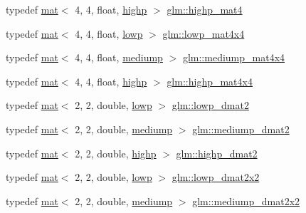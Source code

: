 \begin{DoxyCompactItemize}
\item 
typedef \hyperlink{structglm_1_1mat}{mat}$<$ 4, 4, float, \hyperlink{namespaceglm_a36ed105b07c7746804d7fdc7cc90ff25ac6f7eab42eacbb10d59a58e95e362074}{highp} $>$ \hyperlink{group__core__precision_gab46132805773d55f00fce859bc71e799}{glm\+::highp\+\_\+mat4}
\item 
typedef \hyperlink{structglm_1_1mat}{mat}$<$ 4, 4, float, \hyperlink{namespaceglm_a36ed105b07c7746804d7fdc7cc90ff25ae161af3fc695e696ce3bf69f7332bc2d}{lowp} $>$ \hyperlink{group__core__precision_gaf8957db9f94a9c01a63db849da81bea0}{glm\+::lowp\+\_\+mat4x4}
\item 
typedef \hyperlink{structglm_1_1mat}{mat}$<$ 4, 4, float, \hyperlink{namespaceglm_a36ed105b07c7746804d7fdc7cc90ff25a6416f3ea0c9025fb21ed50c4d6620482}{mediump} $>$ \hyperlink{group__core__precision_ga80dd7aaae2879e86a588c36a39652ee4}{glm\+::mediump\+\_\+mat4x4}
\item 
typedef \hyperlink{structglm_1_1mat}{mat}$<$ 4, 4, float, \hyperlink{namespaceglm_a36ed105b07c7746804d7fdc7cc90ff25ac6f7eab42eacbb10d59a58e95e362074}{highp} $>$ \hyperlink{group__core__precision_ga93c7db376e7b0bd24ef4947667468c9a}{glm\+::highp\+\_\+mat4x4}
\item 
typedef \hyperlink{structglm_1_1mat}{mat}$<$ 2, 2, double, \hyperlink{namespaceglm_a36ed105b07c7746804d7fdc7cc90ff25ae161af3fc695e696ce3bf69f7332bc2d}{lowp} $>$ \hyperlink{group__core__precision_gaf2d0890fdba0e76d2bd2a169c1a71b00}{glm\+::lowp\+\_\+dmat2}
\item 
typedef \hyperlink{structglm_1_1mat}{mat}$<$ 2, 2, double, \hyperlink{namespaceglm_a36ed105b07c7746804d7fdc7cc90ff25a6416f3ea0c9025fb21ed50c4d6620482}{mediump} $>$ \hyperlink{group__core__precision_gadbf2ed2cfb596bd2ca7e980777c0acde}{glm\+::mediump\+\_\+dmat2}
\item 
typedef \hyperlink{structglm_1_1mat}{mat}$<$ 2, 2, double, \hyperlink{namespaceglm_a36ed105b07c7746804d7fdc7cc90ff25ac6f7eab42eacbb10d59a58e95e362074}{highp} $>$ \hyperlink{group__core__precision_ga10defb0dfd989f948d6783e2ca3889d3}{glm\+::highp\+\_\+dmat2}
\item 
typedef \hyperlink{structglm_1_1mat}{mat}$<$ 2, 2, double, \hyperlink{namespaceglm_a36ed105b07c7746804d7fdc7cc90ff25ae161af3fc695e696ce3bf69f7332bc2d}{lowp} $>$ \hyperlink{group__core__precision_gaa0f01b1fb1a32ca63036ee3de89681d4}{glm\+::lowp\+\_\+dmat2x2}
\item 
typedef \hyperlink{structglm_1_1mat}{mat}$<$ 2, 2, double, \hyperlink{namespaceglm_a36ed105b07c7746804d7fdc7cc90ff25a6416f3ea0c9025fb21ed50c4d6620482}{mediump} $>$ \hyperlink{group__core__precision_ga3d91f269872b4664d2f500b6dee986eb}{glm\+::mediump\+\_\+dmat2x2}

\end{DoxyCompactItemize}
